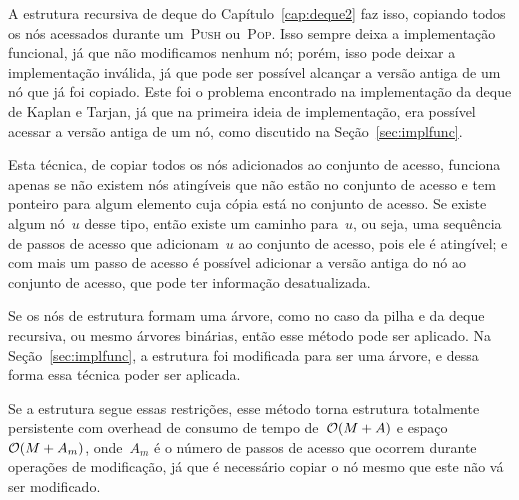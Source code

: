 \documentclass[../../main.tex]{subfiles}
\begin{document}
A estrutura recursiva de deque do Capítulo~\ref{cap:deque2} faz isso, copiando todos os nós acessados durante um~\textsc{Push} ou~\textsc{Pop}. Isso sempre deixa a implementação funcional, já que não modificamos nenhum nó; porém, isso pode deixar a implementação inválida, já que pode ser possível alcançar a versão antiga de um nó que já foi copiado. Este foi o problema encontrado na implementação da deque de Kaplan e Tarjan, já que na primeira ideia de implementação, era possível acessar a versão antiga de um nó, como discutido na Seção~\ref{sec:implfunc}.

Esta técnica, de copiar todos os nós adicionados ao conjunto de acesso, funciona apenas se não existem nós atingíveis que não estão no conjunto de acesso e tem ponteiro para algum elemento cuja cópia está no conjunto de acesso. Se existe algum nó~$u$ desse tipo, então existe um caminho para~$u$, ou seja, uma sequência de passos de acesso que adicionam~$u$ ao conjunto de acesso, pois ele é atingível; e com mais um passo de acesso é possível adicionar a versão antiga do nó ao conjunto de acesso, que pode ter informação desatualizada.

Se os nós de estrutura formam uma árvore, como no caso da pilha e da deque recursiva, ou mesmo árvores binárias, então esse método pode ser aplicado. Na Seção~\ref{sec:implfunc}, a estrutura foi modificada para ser uma árvore, e dessa forma essa técnica poder ser aplicada.

Se a estrutura segue essas restrições, esse método torna estrutura totalmente persistente com overhead de consumo de tempo de~$\mathcal{O}(M+A)$ e espaço~$\mathcal{O}(M+A_m)$, onde~$A_m$ é o número de passos de acesso que ocorrem durante operações de modificação, já que é necessário copiar o nó mesmo que este não vá ser modificado.
\end{document}
